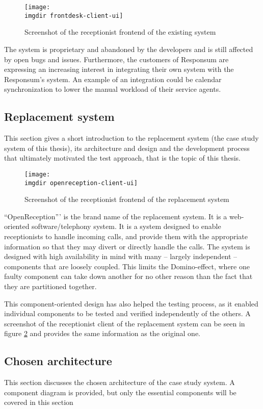 \begin{figure}[!hbpt]
\centering
\texttt{[image: \\imgdir frontdesk-client-ui]}
\caption{Screenshot of the receptionist frontend of the existing system}
\label{fig:frontdesk-client-ui}
\end{figure}

\noindent The system is proprietary and abandoned by the developers and is still affected by open bugs and issues. Furthermore, the customers of Responsum are expressing an increasing interest in integrating their own system with the Responsum's system. An example of an integration could be calendar synchronization to lower the manual workload of their service agents.

\subsection{Replacement system}
This section gives a short introduction to the replacement system (the case study system of this thesis), its architecture and design and the development process that ultimately motivated the test approach, that is the topic of this thesis.\medskip
\begin{figure}[!hbpt]
\centering
\texttt{[image: \\imgdir openreception-client-ui]}
\caption{Screenshot of the receptionist frontend of the replacement system}
\label{fig:openreception-client-ui}
\end{figure}
\noindent ``OpenReception''' is the brand name of the replacement system. It is a web-oriented software/telephony system. It is a system designed to enable receptionists to handle incoming calls, and provide them with the appropriate information so that they may divert or directly handle the calls. The system is designed with high availability in mind with many -- largely independent -- components that are loosely coupled. This limits the Domino-effect, where one faulty component can take down another for no other reason than the fact that they are partitioned together.\medskip

\noindent This component-oriented design has also helped the testing process, as it enabled individual components to be tested and verified independently of the others. A screenshot of the receptionist client of the replacement system can be seen in figure \ref{fig:openreception-client-ui} and provides the same information as the original one.

\subsection{Chosen architecture}
This section discusses the chosen architecture of the case study system. A component diagram is provided, but only the essential components will be covered in this section\medskip

